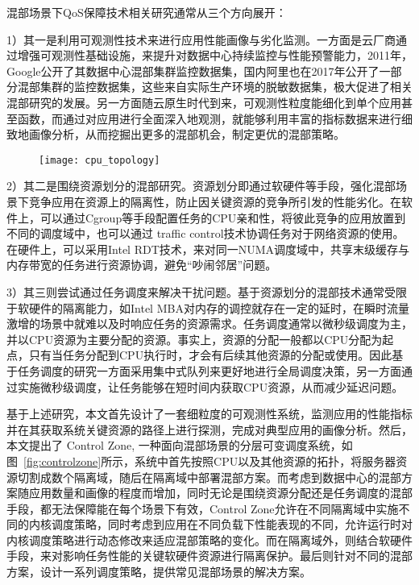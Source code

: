 混部场景下QoS保障技术相关研究通常从三个方向展开：

1）其一是利用可观测性技术来进行应用性能画像与劣化监测。一方面是云厂商通过增强可观测性基础设施，来提升对数据中心持续监控与性能预警能力，2011年，Google公开了其数据中心混部集群监控数据集，国内阿里也在2017年公开了一部分混部集群的监控数据集\citep{guo2019limits}，这些来自实际生产环境的脱敏数据集，极大促进了相关混部研究的发展。另一方面随云原生时代到来，可观测性粒度能细化到单个应用甚至函数，而通过对应用进行全面深入地观测，就能够利用丰富的指标数据来进行细致地画像分析，从而挖掘出更多的混部机会，制定更优的混部策略。

\begin{figure}[!htbp]
    \centering
    \texttt{[image: cpu\_topology]}
    \label{fig:cpu_topology}
\end{figure}

2）其二是围绕资源划分的混部研究。资源划分即通过软硬件等手段，强化混部场景下竞争应用在资源上的隔离性，防止因关键资源的竞争所引发的性能劣化。在软件上，可以通过Cgroup等手段配置任务的CPU亲和性，将彼此竞争的应用放置到不同的调度域中，也可以通过 traffic control技术\citep{hubert2002linux}协调任务对于网络资源的使用。在硬件上，可以采用Intel RDT技术\citep{guide2011intel}，来对同一NUMA调度域中，共享末级缓存与内存带宽的任务进行资源协调，避免“吵闹邻居”问题\citep{xu2018dcat, maricq2018taming, rzadca2020autopilot, kwon2020dc}。

3）其三则尝试通过任务调度来解决干扰问题。基于资源划分的混部技术通常受限于软硬件的隔离能力，如Intel MBA对内存的调控就存在一定的延时\citep{herdrich2016cache}，在瞬时流量激增的场景中就难以及时响应任务的资源需求。任务调度通常以微秒级调度为主，并以CPU资源为主要分配的资源。事实上，资源的分配一般都以CPU分配为起点，只有当任务分配到CPU执行时，才会有后续其他资源的分配或使用。因此基于任务调度的研究一方面采用集中式队列来更好地进行全局调度决策，另一方面通过实施微秒级调度，让任务能够在短时间内获取CPU资源，从而减少延迟问题。

基于上述研究，本文首先设计了一套细粒度的可观测性系统，监测应用的性能指标并在其获取系统关键资源的路径上进行探测，完成对典型应用的画像分析。然后，本文提出了 Control Zone, 一种面向混部场景的分层可变调度系统，如图~\ref{fig:controlzone}所示，系统中首先按照CPU以及其他资源的拓扑，将服务器资源切割成数个隔离域，随后在隔离域中部署混部方案。而考虑到数据中心的混部方案随应用数量和画像的程度而增加，同时无论是围绕资源分配还是任务调度的混部手段，都无法保障能在每个场景下有效，Control Zone允许在不同隔离域中实施不同的内核调度策略，同时考虑到应用在不同负载下性能表现的不同，允许运行时对内核调度策略进行动态修改来适应混部策略的变化。而在隔离域外，则结合软硬件手段，来对影响任务性能的关键软硬件资源进行隔离保护。最后则针对不同的混部方案，设计一系列调度策略，提供常见混部场景的解决方案。

